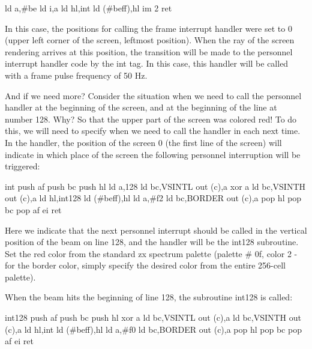                 ld a,#be
                ld i,a
                ld hl,int
                ld (#beff),hl
                im 2
                ret


In this case, the positions for calling the frame interrupt handler were set to
0 (upper left corner of the screen, leftmost position).
When the ray of the screen rendering arrives at this position, the transition
will be made to the personnel interrupt handler code by the int tag.
In this case, this handler will be called with a frame pulse frequency of 50
Hz.

And if we need more?
Consider the situation when we need to call the personnel handler at the
beginning of the screen, and at the beginning of the line at number 128.
Why? So that the upper part of the screen was colored red!
To do this, we will need to specify when we need to call the handler in each
next time. In the handler, the position of the screen 0 (the first line of the
screen) will indicate in which place of the screen the following personnel
interruption will be triggered:

int
                push af
                push bc
                push hl
                ld a,128
                ld bc,VSINTL
                out (c),a
                xor a
                ld bc,VSINTH
                out (c),a
                ld hl,int128
                ld (#beff),hl
                ld a,#f2
                ld bc,BORDER
                out (c),a
                pop hl
                pop bc
                pop af
                ei
                ret


Here we indicate that the next personnel interrupt should be called in the
vertical position of the beam on line 128, and the handler will be the int128
subroutine. Set the red color from the standard zx spectrum palette (palette #
0f, color 2 - for the border color, simply specify the desired color from the
entire 256-cell palette).

When the beam hits the beginning of line 128, the subroutine int128 is called:

int128
                push af
                push bc
                push hl
                xor a
                ld bc,VSINTL
                out (c),a
                ld bc,VSINTH
                out (c),a
                ld hl,int
                ld (#beff),hl
                ld a,#f0
                ld bc,BORDER
                out (c),a
                pop hl
                pop bc
                pop af
                ei
                ret


